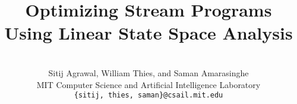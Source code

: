 \documentclass{sig-alternate}
\title{Optimizing Stream Programs \\ Using Linear State Space Analysis}
\author{~ \vspace{-18pt} \\ Sitij Agrawal, William Thies, and Saman Amarasinghe \\[0.2Ex]
   MIT Computer Science and Artificial Intelligence Laboratory \\[0.8Ex]
   \normalsize\tt{\{sitij, thies, saman\}@csail.mit.edu}}
\date{}
\begin{document}
  \newcommand{\subsubsubsection}[1]{\medskip\noindent{\bf #1}\\\smallskip}
  \newcommand{\mt}[1]{\mbox{\it #1}}
  \newcommand{\todo}[1]{\framebox{#1}}
  
  \newlength{\itemshrink}
  \setlength{\itemshrink}{0pt}

  \newcommand{\mysection}[1]{\section{#1}}
  \newcommand{\mysubsection}[1]{\subsection{#1}}
  \newcommand{\mysubsubsection}[1]{\subsubsection{#1}}

  \newcommand{\starteqnstar}[0]{\begin{eqnarray*}}
  \newcommand{\doneeqnstar}[0]{\end{eqnarray*}}
  \newcommand{\starteqn}[0]{\begin{eqnarray}}
  \newcommand{\doneeqn}[0]{\end{eqnarray}}
\end{document}

